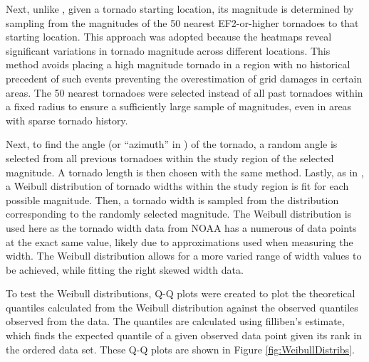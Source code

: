 \documentclass[12pt]{article}
\begin{document}
Next, unlike \cite{strader}, given a tornado starting location, its magnitude is determined by sampling from the magnitudes of the 50 nearest EF2-or-higher tornadoes to that starting location. This approach was adopted because the heatmaps reveal significant variations in tornado magnitude across different locations. This method avoids placing a high magnitude tornado in a region with no historical precedent of such events preventing the overestimation of grid damages in certain areas. The 50 nearest tornadoes were selected instead of all past tornadoes within a fixed radius to ensure a sufficiently large sample of magnitudes, even in areas with sparse tornado history. \par
Next, to find the angle (or “azimuth” in \cite{strader}) of the tornado, a random angle is selected from all previous tornadoes within the study region of the selected magnitude. A tornado length is then chosen with the same method. Lastly, as in \cite{strader}, a Weibull distribution of tornado widths within the study region is fit for each possible magnitude. Then, a tornado width is sampled from the distribution corresponding to the randomly selected magnitude. The Weibull distribution is used here as the tornado width data from NOAA has a numerous of data points at the exact same value, likely due to approximations used when measuring the width. The Weibull distribution allows for a more varied range of width values to be achieved, while fitting the right skewed width data. \par
To test the Weibull distributions, Q-Q plots were created to plot the theoretical quantiles calculated from the Weibull distribution against the observed quantiles observed from the data. The quantiles are calculated using filliben’s estimate, which finds the expected quantile of a given observed data point given its rank in the ordered data set. These Q-Q plots are shown in Figure \ref{fig:WeibullDistribs}.  \par
\end{document}
